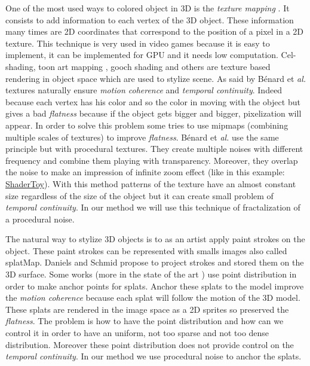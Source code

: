One of the most used ways to colored object in 3D is the \textit{texture mapping} \cite{texture_mapping}. It consists to add information to each vertex of the 3D object. These information many times are 2D coordinates that correspond to the position of a pixel in a 2D texture. This technique is very used in video games because it is easy to implement, it can be implemented for GPU and it needs low computation. Cel-shading, toon art mapping , gooch shading and others\cite{benard_state---art_2011} are texture based rendering in object space\cite{praun_real-time_2001, klein_non-photorealistic_2000, benard_dynamic_2009, benard_dynamic_2010, freudenberg_walk-through_2001} which are used to stylize scene. As said by Bénard et \textit{al.} \cite{benard_dynamic_2009} textures naturally ensure \textit{motion coherence} and \textit{temporal continuity}. Indeed because each vertex has his color and so the color in moving with the object but gives a bad \textit{flatness} because if the object gets bigger and bigger, pixelization will appear. In order to solve this problem some\cite{klein_non-photorealistic_2000, benard_dynamic_2009} tries to use mipmaps (combining multiple scales of textures) to improve \textit{flatness}. Bénard et \textit{al.}\cite{benard_dynamic_2010} use the same principle but with procedural textures. They create multiple noises with different frequency and combine them playing with transparency. Moreover, they overlap the noise to make an impression of infinite zoom effect (like in this example: \href{https://www.shadertoy.com/view/XlBXWw?fbclid=IwAR1fU2JxQzXtks1ZcmVmzrHiv646G8w2gWceeiV-UToeFkAFMQ2NecbsGGs}{ShaderToy}). With this method patterns of the texture have an almost constant size regardless of the size of the object but it can create small problem of \textit{temporal continuity}. In our method we will use this technique of fractalization of a procedural noise.




The natural way to stylize 3D objects is to as an artist apply paint strokes on the object. These paint strokes can be represented with smalls images also called splatMap. Daniels\cite{Daniels_1999} and Schmid\cite{schmid_overcoat} propose to project strokes and stored them on the 3D surface. Some works \cite{meier_painterly_1996, Fekete_2000, chi_stylized_2006}(more in the state of the art \cite{benard_state---art_2011}) use point distribution in order to make anchor points for splats. Anchor these splats to the model improve the \textit{motion coherence} because each splat will follow the motion of the 3D model. These splats are rendered in the image space as a 2D sprites so preserved the \textit{flatness}. The problem is how to have the point distribution and how can we control it in order to have an uniform, not too sparse and not too dense distribution. Moreover these point distribution does not provide control on the \textit{temporal continuity}. In our method we use procedural noise to anchor the splats.






